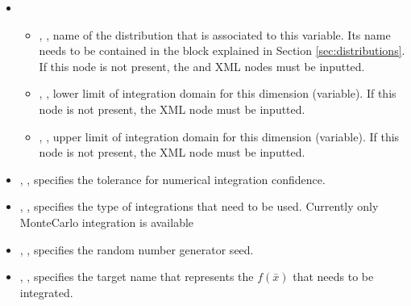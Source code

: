 \begin{itemize}
\item \variableDescription
 \variableChildIntro
 \begin{itemize}
    \item   {}, , name of the distribution that is associated to this variable.
              Its name needs to be contained in the  block explained
              in Section \ref{sec:distributions}. If this node is not present, the  
              and   XML nodes must be inputted.
   \item   {}, , lower limit of integration domain for this dimension (variable).
               If this node is not present, the   XML node must be inputted.
   \item   {}, , upper limit of integration domain for this dimension (variable).
               If this node is not present, the   XML node must be inputted.
  \end{itemize}

    \item  {}, , specifies the tolerance for
               numerical integration confidence.
     \item  {}, , specifies the type of integrations that
                need to be used. Currently only MonteCarlo integration is available
     \item  {}, , specifies the random number generator seed.
     \item  {}, , specifies the target name that represents
                the $f\left ( \bar{x} \right )$ that needs to be integrated.
\end{itemize}

